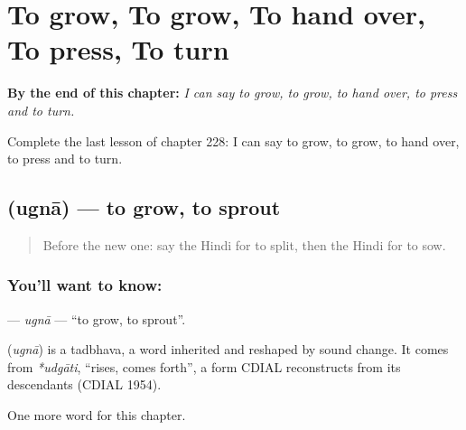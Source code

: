 
\chapter{To grow, To grow, To hand over, To press, To turn}
\label{ch:hi-to-grow-to-grow-to-hand-over-to-press-to-turn}

\begin{chapteropening}
\textbf{By the end of this chapter:} \emph{I can say to grow, to grow, to hand over, to press and to turn.}

Complete the last lesson of chapter 228: I can say to grow, to grow, to hand over, to press and to turn.
\end{chapteropening}

\section[\texorpdfstring{\hi{उगना} (ugnā)}{उगना (ugnā)}]{ (ugnā) — to grow, to sprout}

\label{lesson:HI-C228-ugna}



\begin{quote}
Before the new one: say the Hindi for to split, then the Hindi for to sow.
\end{quote}

\subsection*{You'll want to know: }
\textbf{} — \emph{ugnā} — \textquotedblleft{}to grow, to sprout\textquotedblright{}.

\begin{cousinweb}
\textbf{} (\emph{ugnā}) is a tadbhava, a word inherited and reshaped by sound change. It comes from \emph{*udgāti}, \textquotedblleft{}rises, comes forth\textquotedblright{}, a form CDIAL reconstructs from its descendants (CDIAL 1954).
\end{cousinweb}

\begin{grammarlens}[title={What you've built}]
One more word for this chapter.
\end{grammarlens}

